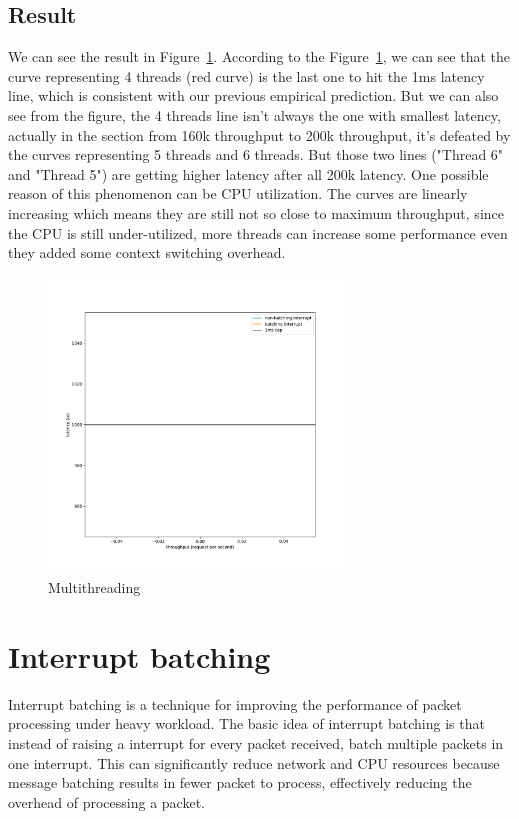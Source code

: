 \documentclass[bsc,frontabs,twoside,singlespacing,parskip,deptreport]{infthesis}     %
\begin{document}
\subsection{Result}
We can see the result in Figure~\ref{fig:threads}. According to the Figure~\ref{fig:threads}, we can see that the curve representing 4 threads (red curve) is the last one to hit the 1ms latency line, which is consistent with our previous empirical prediction. But we can also see from the figure, the 4 threads line isn't always the one with smallest latency, actually in the section from 160k throughput to 200k throughput, it's defeated by the curves representing 5 threads and 6 threads. But those two lines ("Thread 6" and "Thread 5") are getting higher latency after all 200k latency. One possible reason of this phenomenon can be CPU utilization. The curves are linearly increasing which means they are still not so close to maximum throughput, since the CPU is still under-utilized, more threads can increase some performance even they added some context switching overhead.

\begin{figure}[h]
	\centering
	\includegraphics[width=0.7\textwidth,height=0.7\textheight,keepaspectratio]{figure/multithreading.pdf}
	\caption{Multithreading}
	\label{fig:threads}
\end{figure}






\section{Interrupt batching}
Interrupt batching is a technique for improving the performance of packet processing under heavy workload. The basic idea of interrupt batching is that instead of raising a interrupt for every packet received, batch multiple packets in one interrupt. This can significantly reduce network and CPU resources because message batching results in fewer packet to process, effectively reducing the overhead of processing a packet.
\end{document}
